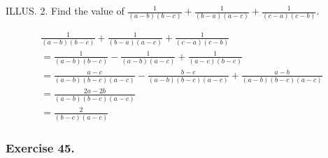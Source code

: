 \documentclass{book}
\begin{document}
ILLUS. 2. Find the value of $\frac{1}{(a-b)(b-c)} + \frac{1}{(b-a)(a-c)} + \frac{1}{(c-a)(c-b)}$.

\[
\begin{array}{c}
\displaystyle \frac{1}{(a-b)(b-c)} + \frac{1}{(b-a)(a-c)} + \frac{1}{(c-a)(c-b)}\\
\displaystyle = \frac{1}{(a-b)(b-c)} - \frac{1}{(a-b)(a-c)} + \frac{1}{(a-c)(b-c)}\\
\displaystyle = \frac{a-c}{(a-b)(b-c)(a-c)} - \frac{b-c}{(a-b)(b-c)(a-c)} + \frac{a-b}{(a-b)(b-c)(a-c)}\\
\displaystyle = \frac{2a-2b}{(a-b)(b-c)(a-c)}\\
\displaystyle = \frac{2}{(b-c)(a-c)}
\end{array}
\]

\subsubsection*{Exercise 45.}
\end{document}
